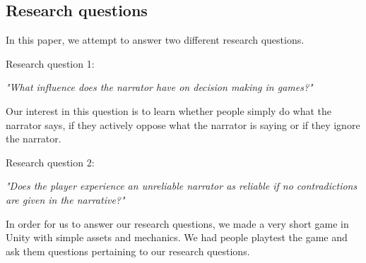 \subsection{Research questions}
In this paper, we attempt to answer two different research questions.

Research question 1:
\begin{center}
\textit{"What influence does the narrator have on decision making in games?"}
\end{center}
Our interest in this question is to learn whether people simply do what the narrator says, if they actively oppose what the narrator is saying or if they ignore the narrator.

Research question 2:
\begin{center}
\textit{"Does the player experience an unreliable narrator as reliable if no contradictions are given in the narrative?"}
\end{center}

In order for us to answer our research questions, we made a very short game in Unity with simple assets and mechanics. We had people playtest the game and ask them questions pertaining to our research questions.